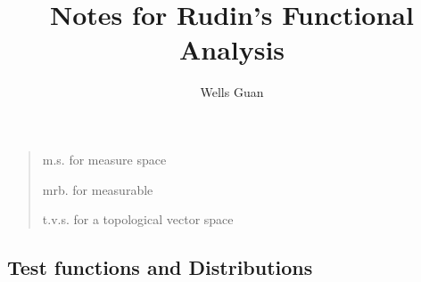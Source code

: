 \documentclass[lang=en, color=blue, ]{elegantbook}
\title{Notes for Rudin's Functional Analysis}
\author{Wells Guan}
\begin{document}


\chapter{}

\begin{quotation}
m.s. for measure space\par
mrb. for measurable\par
t.v.s. for a topological vector space
\end{quotation}

\section{Test functions and Distributions}
\end{document}

